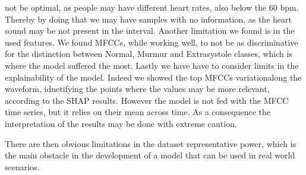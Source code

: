 not be optimal, as people may have different heart rates, also below the 60 bpm. Thereby by doing that 
we may have samples with no information, as the heart sound may be not present in the interval.
Another limitation we found is in the used features. We found MFCCs, while working well, to not be as discriminative
for the distinction between Normal, Murmur and Extrasystole classes, which is where the model suffered the most.
Lastly we have have to consider limits in the explainability of the model. 
Indeed we showed the top MFCCs variationalong the waveform, idnetifying the points where the values may be
more relevant, according to the SHAP results. However the model is not fed with the MFCC time series,
but it relies on their mean across time. As a consequence the interpretation of the results may be done with 
extreme caution. 

There are then obvious limitations in the dataset representative power, which is the main 
obstacle in the development of a model that can be used in real world scenarios.